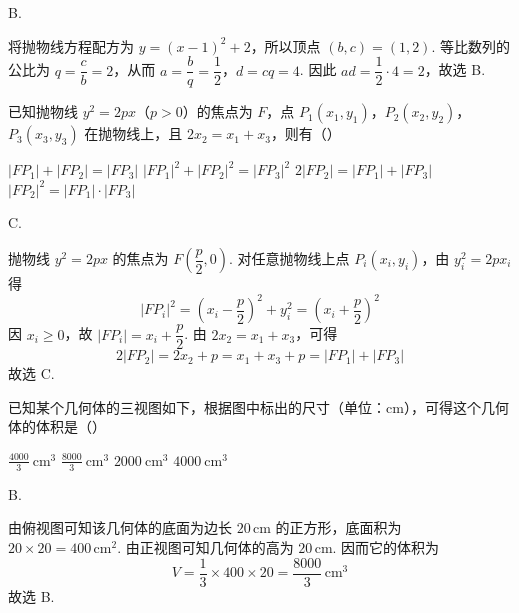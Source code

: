 \begin{answer}
B.
\end{answer}

\begin{solution}
将抛物线方程配方为 \(y=(x-1)^2+2\)，所以顶点 \((b,c)=(1,2)\). 等比数列的公比为 \(q=\dfrac{c}{b}=2\)，从而 \(a=\dfrac{b}{q}=\dfrac12\)，\(d=cq=4\). 因此 \(ad=\dfrac12\cdot4=2\)，故选 B.
\end{solution}

\begin{problem}
已知抛物线 \( y^{2} = 2px \)（\( p > 0 \)）的焦点为 \(F\)，点 \( P_{1}(x_{1}, y_{1}) \)，\( P_{2}(x_{2}, y_{2}) \)，\( P_{3}(x_{3}, y_{3}) \) 在抛物线上，且 \( 2x_{2} = x_{1} + x_{3} \)，则有（\quad）

\choices
    {\( |FP_{1}| + |FP_{2}| = |FP_{3}| \)}
    {\( |FP_{1}|^{2} + |FP_{2}|^{2} = |FP_{3}|^{2} \)}
    {\(2|FP_{2}| = |FP_{1}| + |FP_{3}|\)}
    {\( |FP_{2}|^{2} = |FP_{1}| \cdot |FP_{3}| \)}
\end{problem}

\begin{answer}
C.
\end{answer}

\begin{solution}
抛物线 \(y^2=2px\) 的焦点为 \(F\left(\dfrac p2,0\right)\). 对任意抛物线上点 \(P_i(x_i,y_i)\)，由 \(y_i^2=2px_i\) 得
\[
|FP_i|^2=\left(x_i-\frac p2\right)^2+y_i^2
=\left(x_i+\frac p2\right)^2
\]
因 \(x_i\geqslant0\)，故 \(|FP_i|=x_i+\dfrac p2\). 由 \(2x_2=x_1+x_3\)，可得
\[
2|FP_2|=2x_2+p=x_1+x_3+p=|FP_1|+|FP_3|
\]
故选 C.
\end{solution}

\begin{problem}
已知某个几何体的三视图如下，根据图中标出的尺寸（单位：\(\mathrm{cm}\)），可得这个几何体的体积是（\quad）


\choices
    {\(\frac{4000}{3} \mathrm{~cm}^{3}\)}
    {\(\frac{8000}{3} \mathrm{~cm}^{3}\)}
    {\(2000 \mathrm{~cm}^{3}\)}
    {\(4000 \mathrm{~cm}^{3}\)}
\end{problem}

\begin{answer}
B.
\end{answer}

\begin{solution}
由俯视图可知该几何体的底面为边长 \(20\,\mathrm{cm}\) 的正方形，底面积为 \(20\times20=400\,\mathrm{cm}^2\). 由正视图可知几何体的高为 \(20\,\mathrm{cm}\). 因而它的体积为
\[
V=\frac13\times400\times20=\frac{8000}{3}\,\mathrm{cm}^3
\]
故选 B.
\end{solution}

